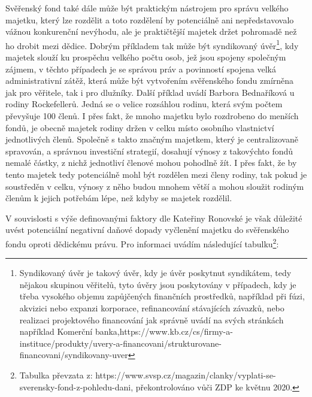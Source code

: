 \documentclass{article}
\begin{document}
 Svěřenský fond také dále může být praktickým nástrojem pro správu velkého majetku, který lze rozdělit a toto rozdělení by potenciálně ani nepředstavovalo vážnou konkurenční nevýhodu, ale je praktičtější majetek držet pohromadě než ho drobit mezi dědice. Dobrým příkladem tak může být syndikovaný úvěr\footnote{Syndikovaný úvěr je takový úvěr, kdy je úvěr poskytnut syndikátem, tedy nějakou skupinou věřitelů, tyto úvěry jsou poskytovány v případech, kdy je třeba vysokého objemu zapůjčených finančních prostředků, například při fúzi, akvizici nebo expanzi korporace, refinancování stávajících závazků, nebo realizaci projektového financování jak správně uvádí na svých stránkách například Komerční banka,https://www.kb.cz/cs/firmy-a-instituce/produkty/uvery-a-financovani/strukturovane-financovani/syndikovany-uver}, kdy majetek slouží ku prospěchu velkého počtu osob, jež jsou spojeny společným zájmem, v těchto případech je se správou práv a povinností spojena velká administrativní zátěž, která může být vytvořením svěřenského fondu zmírněna jak pro věřitele, tak i pro dlužníky. Další příklad uvádí Barbora Bednaříková u rodiny Rockefellerů. Jedná se o velice rozsáhlou rodinu, která svým počtem převyšuje 100 členů. I přes fakt, že mnoho majetku bylo rozdrobeno do menších fondů, je obecně majetek rodiny držen v celku místo osobního vlastnictví jednotlivých členů. Společně s takto značným majetkem, který je centralizovaně spravován, a správnou investiční strategií, dosahují výnosy z takovýchto fondů nemalé částky, z nichž jednotliví členové mohou pohodlně žít. I přes fakt, že by tento majetek tedy potenciálně mohl být rozdělen mezi členy rodiny, tak pokud je soustředěn v celku, výnosy z něho budou mnohem větší a mohou sloužit rodiným členům k jejich potřebám lépe, než kdyby se majetek rozdělil.\\
 
 
 \newpage
 
 V souvislosti s výše definovanými faktory dle Kateřiny Ronovské je však důležité uvést potenciální negativní daňové dopady vyčlenění majetku do svěřenského fondu oproti dědickému právu. Pro informaci uvádím následující tabulku\footnote{Tabulka převzata z: https://www.svsp.cz/magazin/clanky/vyplati-se-sverensky-fond-z-pohledu-dani, překontrolováno vůči ZDP ke květnu 2020.}:\\
 
\end{document}
